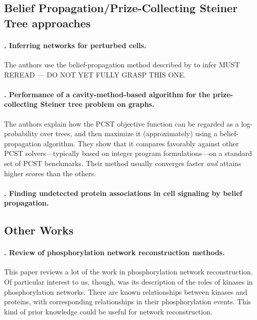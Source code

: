 \documentclass[14pt]{article}
\begin{document}
\subsection{Belief Propagation/Prize-Collecting Steiner Tree approaches}

\paragraph{ \citet{2013-molinelli-perturbation}. Inferring networks for perturbed cells.}
The authors use the belief-propagation method described by \citeauthor{2012-biazzo-steiner} to infer 
MUST REREAD --- DO NOT YET FULLY GRASP THIS ONE.

\paragraph{ \citet{2012-biazzo-steiner}. Performance of a cavity-method-based algorithm for the prize-collecting Steiner tree problem on graphs.}
The authors explain how the PCST objective function can be regarded as a log-probability over trees, and then maximize it (approximately) using a belief-propagation algorithm.
They show that it compares favorably against other PCST solvers---typically based on integer program formulations---on a standard set of PCST benchmarks.
Their method usually converges faster \emph{and} attains higher scores than the others.

\paragraph{ \citet{2011-bailly-bechet-belief}. Finding undetected protein associations in cell signaling by belief propagation.}




\subsection{Other Works}

\paragraph{ \citet{2018-invergo-review}. Review of phosphorylation network reconstruction methods. }
This paper reviews a lot of the work in phosphorylation network reconstruction.
Of particular interest to us, though, was its description of the roles of kinases in phosphorylation networks. 
There are known relationships between kinases and proteins, with corresponding relationships in their phosphorylation events.
This kind of prior knowledge could be useful for network reconstruction.
\end{document}
